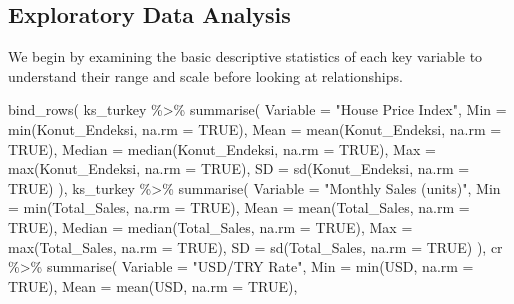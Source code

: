 \documentclass[
  11pt,
  a4paper,
]{article}
\newenvironment{Shaded}{\begin{snugshade}}{\end{snugshade}}
\newcommand{\AttributeTok}[1]{\textcolor[rgb]{0.40,0.45,0.13}{#1}}
\newcommand{\ConstantTok}[1]{\textcolor[rgb]{0.56,0.35,0.01}{#1}}
\newcommand{\FunctionTok}[1]{\textcolor[rgb]{0.28,0.35,0.67}{#1}}
\newcommand{\NormalTok}[1]{\textcolor[rgb]{0.00,0.23,0.31}{#1}}
\newcommand{\SpecialCharTok}[1]{\textcolor[rgb]{0.37,0.37,0.37}{#1}}
\newcommand{\StringTok}[1]{\textcolor[rgb]{0.13,0.47,0.30}{#1}}
\begin{document}
\subsection{Exploratory Data Analysis}\label{exploratory-data-analysis}

We begin by examining the basic descriptive statistics of each key
variable to understand their range and scale before looking at
relationships.

\begin{Shaded}
\begin{Highlighting}[]
\FunctionTok{bind\_rows}\NormalTok{(}
\NormalTok{  ks\_turkey }\SpecialCharTok{\%\textgreater{}\%} \FunctionTok{summarise}\NormalTok{(}
    \AttributeTok{Variable =} \StringTok{"House Price Index"}\NormalTok{,}
    \AttributeTok{Min      =} \FunctionTok{min}\NormalTok{(Konut\_Endeksi, }\AttributeTok{na.rm =} \ConstantTok{TRUE}\NormalTok{),}
    \AttributeTok{Mean     =} \FunctionTok{mean}\NormalTok{(Konut\_Endeksi, }\AttributeTok{na.rm =} \ConstantTok{TRUE}\NormalTok{),}
    \AttributeTok{Median   =} \FunctionTok{median}\NormalTok{(Konut\_Endeksi, }\AttributeTok{na.rm =} \ConstantTok{TRUE}\NormalTok{),}
    \AttributeTok{Max      =} \FunctionTok{max}\NormalTok{(Konut\_Endeksi, }\AttributeTok{na.rm =} \ConstantTok{TRUE}\NormalTok{),}
    \AttributeTok{SD       =} \FunctionTok{sd}\NormalTok{(Konut\_Endeksi, }\AttributeTok{na.rm =} \ConstantTok{TRUE}\NormalTok{)}
\NormalTok{  ),}
\NormalTok{  ks\_turkey }\SpecialCharTok{\%\textgreater{}\%} \FunctionTok{summarise}\NormalTok{(}
    \AttributeTok{Variable =} \StringTok{"Monthly Sales (units)"}\NormalTok{,}
    \AttributeTok{Min      =} \FunctionTok{min}\NormalTok{(Total\_Sales, }\AttributeTok{na.rm =} \ConstantTok{TRUE}\NormalTok{),}
    \AttributeTok{Mean     =} \FunctionTok{mean}\NormalTok{(Total\_Sales, }\AttributeTok{na.rm =} \ConstantTok{TRUE}\NormalTok{),}
    \AttributeTok{Median   =} \FunctionTok{median}\NormalTok{(Total\_Sales, }\AttributeTok{na.rm =} \ConstantTok{TRUE}\NormalTok{),}
    \AttributeTok{Max      =} \FunctionTok{max}\NormalTok{(Total\_Sales, }\AttributeTok{na.rm =} \ConstantTok{TRUE}\NormalTok{),}
    \AttributeTok{SD       =} \FunctionTok{sd}\NormalTok{(Total\_Sales, }\AttributeTok{na.rm =} \ConstantTok{TRUE}\NormalTok{)}
\NormalTok{  ),}
\NormalTok{  cr }\SpecialCharTok{\%\textgreater{}\%} \FunctionTok{summarise}\NormalTok{(}
    \AttributeTok{Variable =} \StringTok{"USD/TRY Rate"}\NormalTok{,}
    \AttributeTok{Min      =} \FunctionTok{min}\NormalTok{(USD, }\AttributeTok{na.rm =} \ConstantTok{TRUE}\NormalTok{),}
    \AttributeTok{Mean     =} \FunctionTok{mean}\NormalTok{(USD, }\AttributeTok{na.rm =} \ConstantTok{TRUE}\NormalTok{),}

\end{Highlighting}
\end{Shaded}
\end{document}
